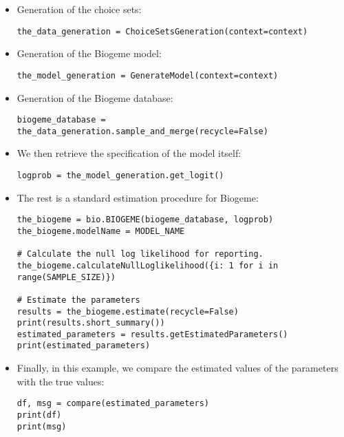\documentclass[12pt,a4paper]{article}
\begin{document}
\begin{itemize}
\item Generation of the choice sets:
  \begin{lstlisting}
the_data_generation = ChoiceSetsGeneration(context=context)
  \end{lstlisting}
\item Generation of the Biogeme model:
  \begin{lstlisting}
the_model_generation = GenerateModel(context=context)
  \end{lstlisting}
\item Generation of the Biogeme database:
  \begin{lstlisting}
biogeme_database = the_data_generation.sample_and_merge(recycle=False)
  \end{lstlisting}

\item We then retrieve the specification of the model itself:
  \begin{lstlisting}
logprob = the_model_generation.get_logit()
  \end{lstlisting}
\item The rest is a standard estimation procedure for Biogeme:
  \begin{lstlisting}
the_biogeme = bio.BIOGEME(biogeme_database, logprob)
the_biogeme.modelName = MODEL_NAME

# Calculate the null log likelihood for reporting.
the_biogeme.calculateNullLoglikelihood({i: 1 for i in range(SAMPLE_SIZE)})

# Estimate the parameters
results = the_biogeme.estimate(recycle=False)
print(results.short_summary())
estimated_parameters = results.getEstimatedParameters()
print(estimated_parameters)
  \end{lstlisting}
\item Finally, in this example, we compare the estimated values of the parameters with the true values:
  \begin{lstlisting}
df, msg = compare(estimated_parameters)
print(df)
print(msg)
  \end{lstlisting}
\end{itemize}
\end{document}

